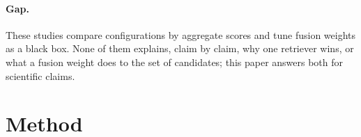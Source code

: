 \documentclass[runningheads]{llncs}
\begin{document}
\paragraph{Gap.} These studies compare configurations by aggregate scores and tune
fusion weights as a black box. None of them explains, claim by claim, why one
retriever wins, or what a fusion weight does to the set of candidates; this paper
answers both for scientific claims.

\section{Method}
\label{sec:method}

\end{document}
